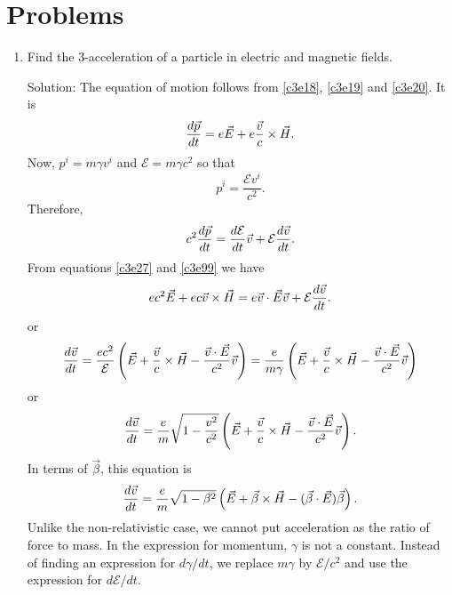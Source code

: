\section{Problems}
\begin{enumerate}
\item Find the 3-acceleration of a particle in electric and magnetic fields.
\item[Solution:] The equation of motion follows from \eqref{c3e18}, 
\eqref{c3e19} and \eqref{c3e20}. It is
\begin{equation}\label{c3e100}
\frac{d{\vec{p}}}{d{t}} = e\vec{E} + e\frac{\vec{v}}{c}\times\vec{H}.
\end{equation}
Now, $p^i = m\gamma v^i$ and $\mathcal{E} = m\gamma c^2$ so that 
\[
p^i = \frac{\mathcal{E} v^i}{c^2}.
\]
Therefore,
\[
c^2\frac{d{\vec{p}}}{d{t}} = \frac{d{\mathcal{E}}}{d{t}}\vec{v} + \mathcal{E}\frac{d{\vec{v}}}{d{t}}.
\]
From equations \eqref{c3e27} and \eqref{c3e99} we have
\[
ec^2\vec{E} + ec\vec{v}\times\vec{H} = 
e\vec{v}\cdot\vec{E}\vec{v} + \mathcal{E}\frac{d{\vec{v}}}{d{t}}.
\]
or
\[
\frac{d{\vec{v}}}{d{t}} = \frac{ec^2}{\mathcal{E}}
\left(\vec{E} + \frac{\vec{v}}{c}\times\vec{H} - 
\frac{\vec{v}\cdot\vec{E}}{c^2}\vec{v}\right)
= \frac{e}{m\gamma}
\left(\vec{E} + \frac{\vec{v}}{c}\times\vec{H} - 
\frac{\vec{v}\cdot\vec{E}}{c^2}\vec{v}\right)
\]
or
\begin{equation}\label{c3e101}
\frac{d{\vec{v}}}{d{t}} = \frac{e}{m}\sqrt{1 - \frac{v^2}{c^2}}
\left(\vec{E} + \frac{\vec{v}}{c}\times\vec{H} - 
\frac{\vec{v}\cdot\vec{E}}{c^2}\vec{v}\right).
\end{equation}
In terms of $\vec{\beta}$, this equation is
\begin{equation}\label{c3e102}
\frac{d{\vec{v}}}{d{t}} = \frac{e}{m}\sqrt{1 - \beta^2}
\left(\vec{E} + 
\vec{\beta}\times\vec{H} - (\vec{\beta}\cdot\vec{E})\vec{\beta}\right).
\end{equation}
Unlike the non-relativistic case, we cannot put acceleration as the ratio of 
force to mass. In the expression for momentum, $\gamma$ is not a constant. 
Instead of finding an expression for $d\gamma/dt$, we replace $m\gamma$ by 
$\mathcal{E}/c^2$ and use the expression for $d\mathcal{E}/dt$.


\end{enumerate}
